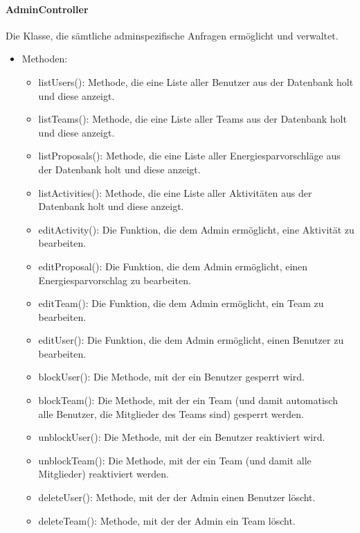 	\paragraph{AdminController}Die Klasse, die s\"amtliche adminspezifische Anfragen erm\"oglicht und verwaltet.
		\begin{itemize}
			\item Methoden:
			\begin{itemize}
				\item listUsers(): Methode, die eine Liste aller Benutzer aus der Datenbank holt und diese anzeigt.
				\item listTeams(): Methode, die eine Liste aller Teams aus der Datenbank holt und diese anzeigt.
				\item listProposals(): Methode, die eine Liste aller Energiesparvorschl\"age aus der Datenbank holt und diese anzeigt.
				\item listActivities(): Methode, die eine Liste aller Aktivit\"aten aus der Datenbank holt und diese anzeigt.
				\item editActivity(): Die Funktion, die dem Admin erm\"oglicht, eine Aktivit\"at zu bearbeiten.
				\item editProposal(): Die Funktion, die dem Admin erm\"oglicht, einen Energiesparvorschlag zu bearbeiten.
				\item editTeam(): Die Funktion, die dem Admin erm\"oglicht, ein Team zu bearbeiten.
				\item editUser(): Die Funktion, die dem Admin erm\"oglicht, einen Benutzer zu bearbeiten.
				\item blockUser(): Die Methode, mit der ein Benutzer gesperrt wird.
				\item blockTeam(): Die Methode, mit der ein Team (und damit automatisch alle Benutzer, die Mitglieder des Teams sind) gesperrt werden.
				\item unblockUser(): Die Methode, mit der ein Benutzer reaktiviert wird.
				\item unblockTeam(): Die Methode, mit der ein Team (und damit alle Mitglieder) reaktiviert werden.
				\item deleteUser(): Methode, mit der der Admin einen Benutzer l\"oscht.
				\item deleteTeam(): Methode, mit der der Admin ein Team l\"oscht.
			\end{itemize}
		\end{itemize}
